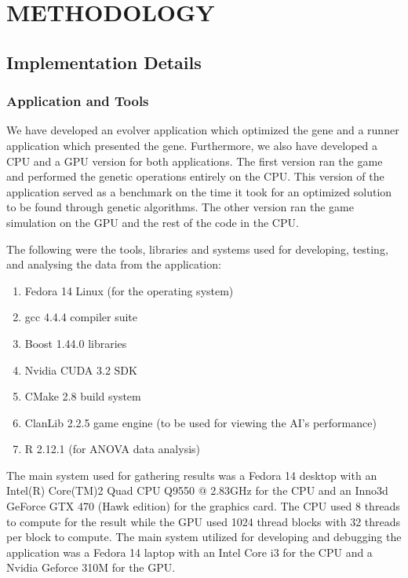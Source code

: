 \chapter{METHODOLOGY}
%
%
\section{Implementation Details}

\subsection{Application and Tools}
We have developed an evolver application which optimized the gene and a runner
application which presented the gene. Furthermore, we also have developed a CPU and
a GPU version for both applications. The first version ran the game and performed 
the genetic operations entirely on the CPU. This version of the application served 
as a benchmark on the time it took for an optimized solution to be found through 
genetic algorithms. The other version ran the game simulation on the GPU and 
the rest of the code in the CPU.


The following were the tools, libraries and systems used for developing, testing,
and analysing the data from the application:

\begin{enumerate}
  \item Fedora 14 Linux (for the operating system)
  \item gcc 4.4.4 compiler suite
  \item Boost 1.44.0 libraries
  \item Nvidia CUDA 3.2 SDK
  \item CMake 2.8 build system
  \item ClanLib 2.2.5 game engine (to be used for viewing the AI's performance)
  \item R 2.12.1 (for ANOVA data analysis)
\end{enumerate}

The main system used for gathering results was a Fedora 14 desktop with an 
Intel(R) Core(TM)2 Quad CPU Q9550 @ 2.83GHz for the CPU and an 
Inno3d GeForce GTX 470 (Hawk edition) for the graphics card. The CPU used 8
threads to compute for the result while the GPU used 1024 thread blocks with
32 threads per block to compute. The main system utilized for developing and 
debugging the application was a Fedora 14 laptop with an Intel Core i3 for 
the CPU and a Nvidia Geforce 310M for the GPU.



